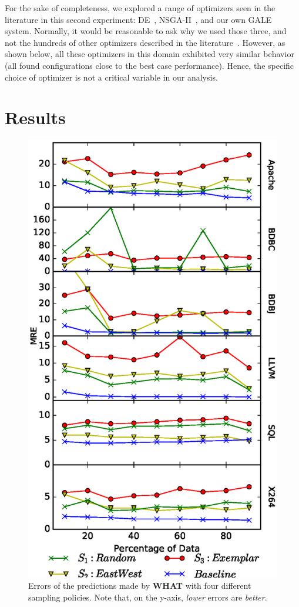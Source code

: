 \documentclass{newsig}
\newcommand{\what}{{\bf WHAT }}
\begin{document}
For the sake of completeness, we explored
a range of optimizers seen in the   literature in this second experiment:  DE~\cite{storn1997differential}, NSGA-II~\cite{deb00afast},
and our own GALE~\cite{krall2014gale,zuluaga2013active} system.   Normally,
it would be  reasonable to ask
why we used those three, and not the hundreds of other 
optimizers described in the literature~\cite{fletcher13,harman12}. However,
as shown below, all these optimizers in this
domain exhibited  very similar
behavior (all found configurations close to the
best case performance). Hence, the specific
choice of optimizer is not a critical
variable in  our analysis.



\section{Results}


\begin{figure}[!t]
\includegraphics[width=0.9\linewidth]{Figures/SamplingAccuracy.eps}
\caption{Errors of the predictions made by \what with four different
sampling policies. Note that, on the y-axis,  {\em lower} errors are {\em better}.
}
\label{fig:sampling_accuracy}
\end{figure}
\end{document}
